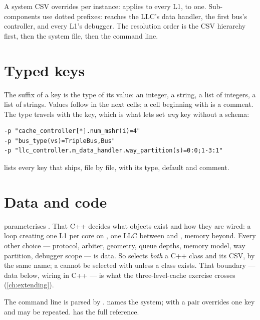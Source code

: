 A system CSV overrides per instance:  applies to every
L1,  to one. Sub-components use dotted prefixes:
 reaches the LLC's data handler,
 the first bus's controller, and
 every L1's debugger. The resolution order is the
CSV hierarchy first, then the system file, then the command line.

\section{Typed keys}

The suffix of a key is the type of its value:  an integer,  a string,
 a list of integers,  a list of strings. Values follow in the next cells;
a cell beginning with \code{\#} is a comment. The type travels with the key, which is what lets
 set \emph{any} key without a schema:

\begin{lstlisting}[style=shell]
-p "cache_controller[*].num_mshr(i)=4"
-p "bus_type(vs)=TripleBus,Bus"
-p "llc_controller.m_data_handler.way_partition(s)=0:0;1-3:1"
\end{lstlisting}

 lists every key that ships, file by file, with its type, default and
comment.

\section{Data and code}

 parameterises .
That C++ decides what objects exist and how they are wired: a loop creating one L1 per core on
, one LLC between  and , memory beyond. Every other
choice --- protocol, arbiter, geometry, queue depths, memory model, way partition, debugger
scope --- is data. So  selects \emph{both} a C++ class and its CSV, by the same
name; a  cannot be selected with  unless a 
class exists. That boundary --- data below, wiring in C++ --- is what the three-level-cache
exercise crosses (\cref{ch:extending}).

The command line is parsed by .  names the system;  with a
 pair overrides one key and may be repeated.  has the full
reference.

